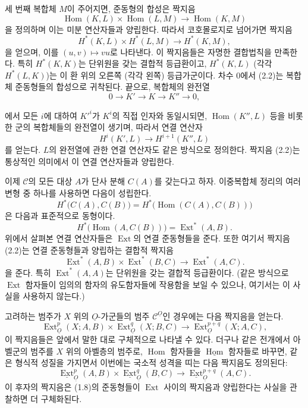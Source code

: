 \documentclass[11pt,twoside,openany]{book}
\numberwithin{equation}{section}
\newcommand{\sourceunit}{front}
\newcommand{\src}[1]{%
  \phantomsection\hypertarget{src:\sourceunit:#1}{}%
  \marginpar{\raggedleft\footnotesize\sffamily #1}%
}
\newcommand{\Osh}{\underline{O}}
\newcommand{\Ccat}{\mathcal C}
\newcommand{\Homsh}{\underline{\operatorname{Hom}}}
\newcommand{\Extsh}{\underline{\operatorname{Ext}}}
\newcommand{\fquote}[1]{\textquotedbl#1\textquotedbl}
\theoremstyle{plain}
\theoremstyle{definition}
\theoremstyle{remark}
\begin{document}
세 번째 복합체 $M$이 주어지면, 준동형의 합성은 짝지음
\[
  \operatorname{Hom}(K,L)\times\operatorname{Hom}(L,M)
  \longrightarrow\operatorname{Hom}(K,M)
\]
을 정의하며 이는 미분 연산자들과 양립한다. 따라서 코호몰로지로
넘어가면 짝지음
\begin{equation}\tag{2.2}
  H^{*}(K,L)\times H^{*}(L,M)\longrightarrow H^{*}(K,M),
\end{equation}
을 얻으며, 이를 $(u,v)\longmapsto vu$로 나타낸다. 이 짝지음들은 자명한
결합법칙을 만족한다. 특히 $H^{*}(K,K)$는 단위원을 갖는 결합적
등급환이고, $H^{*}(K,L)$ (각각 $H^{*}(L,K)$)는 이 환 위의 오른쪽
(각각 왼쪽) 등급가군이다. 차수 $0$에서 (2.2)는 복합체 준동형들의
합성으로 귀착된다. 끝으로, 복합체의 완전열
\[
  0\longrightarrow K'\longrightarrow K\longrightarrow K''\longrightarrow 0,
\]
\src{172}
에서 모든 $i$에 대하여 $K'^{i}$가 $K^{i}$의 직접 인자와 동일시되면,
$\operatorname{Hom}(K'',L)$ 등을 비롯한 군의 복합체들의 완전열이
생기며, 따라서 연결 연산자
\[
  H^{i}(K',L)\longrightarrow H^{i+1}(K'',L)
\]
를 얻는다. $L$의 완전열에 관한 연결 연산자도 같은 방식으로 정의한다.
짝지음 (2.2)는 통상적인 의미에서 이 연결 연산자들과 양립한다.

이제 $\Ccat$의 모든 대상 $A$가 단사 분해 $C(A)$를 갖는다고 하자.
이중복합체 정리의 여러 변형 중 하나를 사용하면 다음이 성립한다.
\[
  H^{*}\bigl(C(A),C(B)\bigr)
  =H^{*}\bigl(\operatorname{Hom}(C(A),C(B))\bigr)
\]
은 다음과 표준적으로 동형이다.
\[
  H^{*}\bigl(\operatorname{Hom}(A,C(B))\bigr)
  =\operatorname{Ext}^{*}(A,B).
\]
위에서 살펴본 연결 연산자들은 $\operatorname{Ext}$의 연결 준동형들을
준다. 또한 여기서 짝지음 (2.2)는 연결 준동형들과 양립하는 결합적
짝지음
\begin{equation}\tag{2.3}
  \operatorname{Ext}^{*}(A,B)\times\operatorname{Ext}^{*}(B,C)
  \longrightarrow\operatorname{Ext}^{*}(A,C).
\end{equation}
을 준다. 특히 $\operatorname{Ext}^{*}(A,A)$는 단위원을 갖는 결합적
등급환이다. (같은 방식으로 $\operatorname{Ext}$ 함자들이 임의의 함자의
유도함자들에 작용함을 보일 수 있으나, 여기서는 이 사실을 사용하지 않는다.)

고려하는 범주가 $X$ 위의
$\Osh$-가군들의 범주 $\Ccat^{\Osh}$인 경우에는 다음 짝지음을 얻는다.
\begin{equation}\tag{2.4}
  \operatorname{Ext}_{\Osh}^{p}(X;A,B)
  \times\operatorname{Ext}_{\Osh}^{q}(X;B,C)
  \longrightarrow\operatorname{Ext}_{\Osh}^{p+q}(X;A,C),
\end{equation}
이 짝지음들은 앞에서 말한 대로 구체적으로 나타낼 수 있다. 더구나 같은
전개에서 아벨군의 범주를 $X$ 위의 아벨층의
범주로, $\operatorname{Hom}$ 함자들을
$\Homsh$ 함자들로 바꾸면, 같은 형식적 성질을 가지면서
이번에는 \fquote{국소적 성격}을 띠는 다음 짝지음도 정의된다:
\begin{equation}\tag{2.5}
  \Extsh_{\Osh}^{p}(A,B)\times\Extsh_{\Osh}^{q}(B,C)
  \longrightarrow\Extsh_{\Osh}^{p+q}(A,C).
\end{equation}
이 후자의 짝지음은 (1.8)의 준동형들이
$\operatorname{Ext}$ 사이의 짝지음과 양립한다는 사실을 관찰하면 더 구체화된다.
\end{document}
